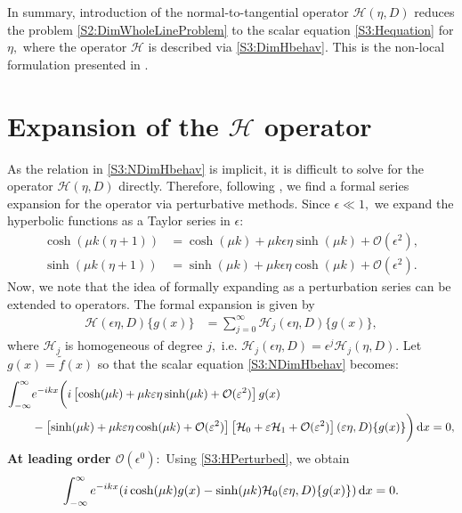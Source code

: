In summary, introduction of the normal-to-tangential operator $\mathcal{H}(\eta, D)$ reduces the problem \eqref{S2:DimWholeLineProblem} to the scalar equation \eqref{S3:Hequation} for $\eta,$ where the operator $\mathcal{H}$ is described via \eqref{S3:DimHbehav}. This is the non-local formulation presented in \cite{OV2013}. 

\section{Expansion of the $\mathcal{H}$ operator}
As the relation in \eqref{S3:NDimHbehav} is implicit, it is difficult to solve for the operator $\mathcal{H}(\eta, D)$ directly. Therefore, following \cite{CS1993}, we find a formal series expansion for the operator via perturbative methods. Since $\epsilon \ll 1,$ we expand the hyperbolic functions as a Taylor series in $\epsilon:$
\begin{align*}
\cosh(\mu k(\eta+1)) &= \cosh(\mu k) + \mu k \epsilon \eta \sinh(\mu k) + \mathcal{O}(\epsilon^2), \\
\sinh(\mu k(\eta+1)) &= \sinh(\mu k) + \mu k \epsilon \eta \cosh(\mu k) + \mathcal{O}(\epsilon^2).
\end{align*}
Now, we note that the idea of formally expanding as a perturbation series can be extended to operators. The formal expansion is given by 
\begin{align*}
\mathcal{H}( \epsilon \eta, D)\{ g(x) \} &= \sum^{\infty}_{j=0} \mathcal{H}_j( \epsilon \eta, D)\{ g(x) \}, 
\end{align*}
where $\mathcal{H}_j$ is homogeneous of degree $j,$ i.e. $\mathcal{H}_j( \epsilon \eta, D) =  \epsilon ^j \mathcal{H}_j(\eta, D).$ Let $g(x) = \tilde{f}(x)$ so that the scalar equation \eqref{S3:NDimHbehav} becomes:
\begin{equation}\label{S3:HPerturbed}
\begin{aligned}
\int_{-\infty}^{\infty} &e^{-ikx}\bigg( i \left[ \cosh(\mu k) + \mu k \varepsilon \eta \sinh(\mu k) + \mathcal{O}(\varepsilon^2) \right] g(x) \\
&- \left[ \sinh(\mu k) + \mu k \varepsilon \eta \cosh(\mu k) + \mathcal{O}(\varepsilon^2)\right] \left[ \mathcal{H}_0 + \varepsilon \mathcal{H}_1 + \mathcal{O}(\varepsilon^2) \right]( \varepsilon \eta, D)\{ g(x) \}\bigg) \,\mathrm{d} x = 0,
\end{aligned}
\end{equation}
\textbf{At leading order $\mathcal{O}(\epsilon^0):$} Using \eqref{S3:HPerturbed}, we obtain 
\begin{equation*}
\int_{-\infty}^{\infty} e^{-ikx}( i  \cosh(\mu k) g(x) - \sinh(\mu k) \mathcal{H}_0( \varepsilon \eta, D)\{ g(x) \}) \,\mathrm{d} x = 0.
\end{equation*}
